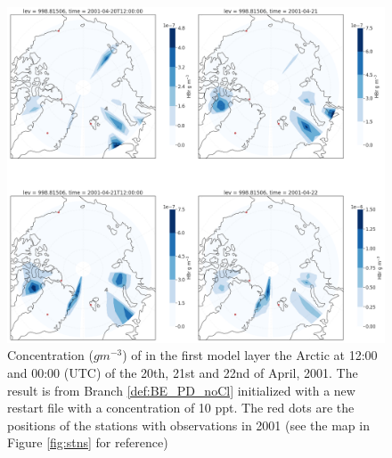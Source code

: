 \begin{figure}[h]
    \centering
    \includegraphics[width=\linewidth]{Chapter6_Results/images/polarHBr_newRestart.png}
    \caption{Concentration ($g m^{-3}$) of  in the first model layer the Arctic at 12:00 and 00:00 (UTC) of the 20th, 21st and 22nd of April, 2001. The result is from Branch \ref{def:BE_PD_noCl} initialized with a new restart file with a  concentration of 10 ppt. The red dots are the positions of the stations with observations in 2001 (see the map in Figure \ref{fig:stns} for reference)}
    \label{fig:polarHBr_newRestart}
\end{figure}